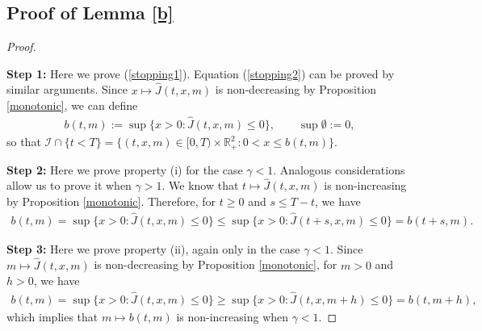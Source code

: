 \documentclass[a4paper,11pt]{amsart}
\numberwithin{equation}{section}
\begin{document}
{\subsection{Proof of Lemma \ref{b}}
\begin{proof}\label{prob}


\textbf{Step 1:} Here we prove (\ref{stopping1}). Equation (\ref{stopping2}) can be proved by similar arguments. Since $x\mapsto\widehat J(t,x,m)$ is non-decreasing by Proposition \ref{monotonic}, we can define
\begin{align*}
b(t,m):=\sup\{x>0:\widehat J(t,x,m)\leq0\},\qquad\sup\emptyset:=0,
\end{align*}
so that $\mathcal I \cap \{t<T\} =\{(t,x,m)\in[0,T)\times\mathbb R_+^2:0<x\leq b(t,m)\}.$

\textbf{Step 2:} Here we prove property (i) for the case $\gamma<1$. Analogous considerations allow us to prove it when $\gamma>1$. We know that $t\mapsto\widehat J(t,x,m)$ is non-increasing by Proposition \ref{monotonic}. Therefore, for $t\geq0$ and $s\leq T-t$, we have
\begin{align*}
b(t,m)=\sup\{x>0:\widehat J(t,x,m)\leq0\}\leq\sup\{x>0:\widehat J(t+s,x,m)\leq0\}=b(t+s,m).
\end{align*}

\textbf{Step 3:} Here we prove property (ii), again only in the case $\gamma<1$. Since $m\mapsto\widehat J(t,x,m)$ is non-decreasing by Proposition \ref{monotonic}, for $m>0$ and $h>0$, we have
\begin{align*}
b(t,m)=\sup\{x>0:\widehat J(t,x,m)\leq0\}\geq\sup\{x>0:\widehat J(t,x,m+h)\leq0\}=b(t,m+h),
\end{align*}
which implies that $m\mapsto b(t,m)$ is non-increasing when $\gamma<1$.


\end{proof}}
\end{document}
